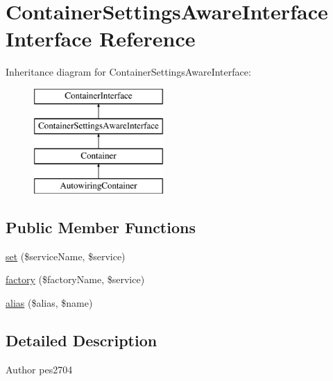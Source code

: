 \hypertarget{interface_pes_1_1_container_1_1_container_settings_aware_interface}{}\section{Container\+Settings\+Aware\+Interface Interface Reference}
\label{interface_pes_1_1_container_1_1_container_settings_aware_interface}
Inheritance diagram for Container\+Settings\+Aware\+Interface\+:\begin{figure}[H]
\begin{center}
\leavevmode
\includegraphics[height=4.000000cm]{interface_pes_1_1_container_1_1_container_settings_aware_interface}
\end{center}
\end{figure}
\subsection*{Public Member Functions}
\begin{DoxyCompactItemize}
\item 
\mbox{\hyperlink{interface_pes_1_1_container_1_1_container_settings_aware_interface_a0a6f88d94e8821447a2e233146b18344}{set}} (\$service\+Name, \$service)
\item 
\mbox{\hyperlink{interface_pes_1_1_container_1_1_container_settings_aware_interface_af120db1d78ad428681293ca220675616}{factory}} (\$factory\+Name, \$service)
\item 
\mbox{\hyperlink{interface_pes_1_1_container_1_1_container_settings_aware_interface_a2c929207e3eb4803b5841ad89133cbbe}{alias}} (\$alias, \$name)
\end{DoxyCompactItemize}


\subsection{Detailed Description}
\begin{DoxyAuthor}{Author}
pes2704 
\end{DoxyAuthor}


